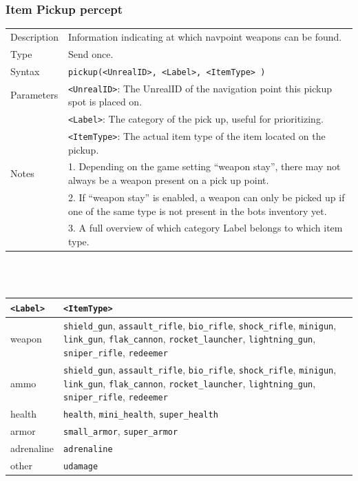 \documentclass[11pt,a4paper]{article}
\begin{document}
\subsubsection*{Item Pickup percept}
\begin{small}
\begin{tabular}{p{2cm}p{9cm}}
Description & Information indicating at which navpoint weapons can be found.\\
Type & Send once.\\
Syntax & \verb|pickup(<UnrealID>, <Label>, <ItemType> )|\\
Parameters &
	\verb|<UnrealID>|: The UnrealID of the navigation point this pickup spot is placed on.\\
&	\verb|<Label>|: The category of the pick up, useful for prioritizing.\\
&	\verb|<ItemType>|: The actual item type of the item located on the pickup. \\
Notes & 
	1.	Depending on the game setting ``weapon stay'', there may not always be a weapon present on a pick up point. \\
&	2.	If ``weapon stay'' is enabled, a weapon can only be picked up if one of the same type is not present in the bots inventory yet.\\
&	3.	A full overview of which category Label belongs to which item type.
\end{tabular}
\end{small}
\\\\
\begin{small}
\begin{tabular}{|p{2cm}|p{9cm}|}	
	\hline
\verb|<Label>| & \verb|<ItemType>|\\
\hline
weapon &
\verb|shield_gun|, \verb|assault_rifle|, \verb|bio_rifle|, \verb|shock_rifle|, \verb|minigun|, \verb|link_gun|, \verb|flak_cannon|, \verb|rocket_launcher|, \verb|lightning_gun|, \verb|sniper_rifle|, \verb|redeemer|\\
ammo &
\verb|shield_gun|, \verb|assault_rifle|, \verb|bio_rifle|, \verb|shock_rifle|, \verb|minigun|, \verb|link_gun|, \verb|flak_cannon|, \verb|rocket_launcher|, \verb|lightning_gun|, \verb|sniper_rifle|, \verb|redeemer|\\
health & \verb|health|, \verb|mini_health|, \verb|super_health|\\
armor & \verb|small_armor|, \verb|super_armor|\\
adrenaline & \verb|adrenaline|\\
other & \verb|udamage|\\
 \hline
\end{tabular}
\end{small}
\end{document}
